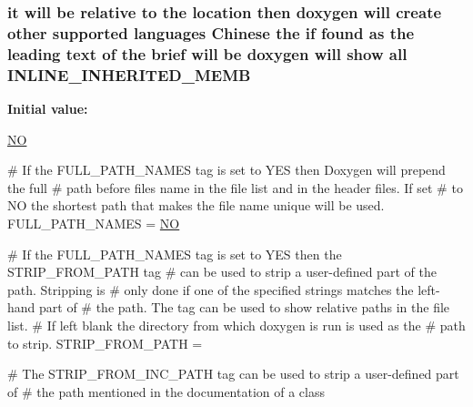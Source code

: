 \hypertarget{mkdoc_8dox_a917faf68b4323d3cbd972106282ca4e7}{
\subsubsection[{I\-N\-L\-I\-N\-E\-\_\-\-I\-N\-H\-E\-R\-I\-T\-E\-D\-\_\-\-M\-E\-M\-B}]{\setlength{\rightskip}{0pt plus 5cm}it will be relative to the location then doxygen will create other supported languages {\bf Chinese} the if found as the leading text of the brief will be doxygen will show all I\-N\-L\-I\-N\-E\-\_\-\-I\-N\-H\-E\-R\-I\-T\-E\-D\-\_\-\-M\-E\-M\-B}}\label{mkdoc_8dox_a917faf68b4323d3cbd972106282ca4e7}
{\bfseries Initial value\-:}
\begin{DoxyCode}
 \hyperlink{mkdoc_8dox_a0f6a46245280dc38baf9600906aa1393}{NO}

\textcolor{preprocessor}{# If the FULL\_PATH\_NAMES tag is set to YES then Doxygen will prepend the full }
\textcolor{preprocessor}{}\textcolor{preprocessor}{# path before files name in the file list and in the header files. If set }
\textcolor{preprocessor}{}\textcolor{preprocessor}{# to NO the shortest path that makes the file name unique will be used.}
\textcolor{preprocessor}{}
FULL\_PATH\_NAMES        = \hyperlink{mkdoc_8dox_a0f6a46245280dc38baf9600906aa1393}{NO}

\textcolor{preprocessor}{# If the FULL\_PATH\_NAMES tag is set to YES then the STRIP\_FROM\_PATH tag }
\textcolor{preprocessor}{}\textcolor{preprocessor}{# can be used to strip a user-defined part of the path. Stripping is }
\textcolor{preprocessor}{}\textcolor{preprocessor}{# only done if one of the specified strings matches the left-hand part of }
\textcolor{preprocessor}{}\textcolor{preprocessor}{# the path. The tag can be used to show relative paths in the file list. }
\textcolor{preprocessor}{}\textcolor{preprocessor}{# If left blank the directory from which doxygen is run is used as the }
\textcolor{preprocessor}{}\textcolor{preprocessor}{# path to strip.}
\textcolor{preprocessor}{}
STRIP\_FROM\_PATH        = 

\textcolor{preprocessor}{# The STRIP\_FROM\_INC\_PATH tag can be used to strip a user-defined part of }
\textcolor{preprocessor}{# the path mentioned in the documentation of a class}
\end{DoxyCode}


